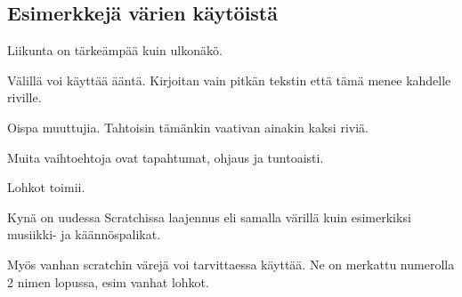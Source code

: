 \documentclass[12pt,twoside]{article}
\begin{document}
\subsection*{Esimerkkejä värien käytöistä}
\begin{vaihetaso1}
	\item \textcolor{liike}{Liikunta} on tärkeämpää kuin \textcolor{ulkonako}{ulkonäkö}. 
	
	\begin{vaihetaso2}
		\item Välillä voi käyttää \textcolor{aani}{ääntä}. Kirjoitan vain pitkän tekstin että tämä menee kahdelle riville.
		\item Oispa \textcolor{muuttujat}{muuttujia}. Tahtoisin tämänkin vaativan ainakin kaksi riviä.
		
		\begin{vaihetaso3}
			\item Muita vaihtoehtoja ovat \textcolor{tapahtumat}{tapahtumat}, \textcolor{ohjaus}{ohjaus} ja \textcolor{tuntoaisti}{tuntoaisti}.
		\end{vaihetaso3}
	\end{vaihetaso2}
	
	\item \textcolor{lohkot}{Lohkot} \textcolor{toiminnot}{toimii}.
	\item \textcolor{laajennus}{Kynä} on uudessa Scratchissa laajennus eli samalla värillä kuin esimerkiksi \textcolor{laajennus}{musiikki-} ja \textcolor{laajennus}{käännöspalikat}.
	\item Myös vanhan scratchin värejä voi tarvittaessa käyttää. Ne on merkattu numerolla 2 nimen lopussa, esim \textcolor{lohkot2}{vanhat lohkot}.
\end{vaihetaso1}
\end{document}
